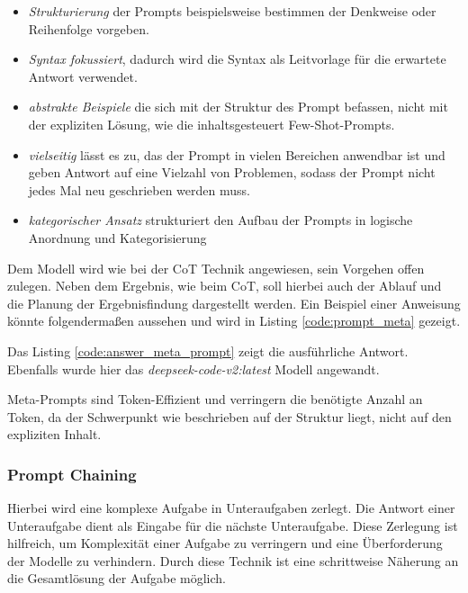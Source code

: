 \begin{itemize}
	\item \textit{Strukturierung} der Prompts beispielsweise bestimmen der Denkweise oder Reihenfolge vorgeben.
	\item \textit{Syntax fokussiert}, dadurch wird die Syntax als Leitvorlage für die erwartete Antwort verwendet.
	\item \textit{abstrakte Beispiele} die sich mit der Struktur des Prompt befassen, nicht mit der expliziten Lösung, wie die inhaltsgesteuert Few-Shot-Prompts.
	\item \textit{vielseitig} lässt es zu, das der Prompt in vielen Bereichen anwendbar ist und geben Antwort auf eine Vielzahl von Problemen, sodass der Prompt nicht jedes Mal neu geschrieben werden muss.
	\item \textit{kategorischer Ansatz} strukturiert den Aufbau der Prompts in logische Anordnung und Kategorisierung 
\end{itemize}

Dem Modell wird wie bei der CoT Technik angewiesen, sein Vorgehen offen zulegen. Neben dem Ergebnis, wie beim CoT, soll hierbei auch der Ablauf und die Planung der Ergebnisfindung dargestellt werden. Ein Beispiel einer Anweisung könnte folgendermaßen aussehen und wird in Listing \ref{code:prompt_meta} gezeigt.



Das Listing \ref{code:answer_meta_prompt} zeigt die ausführliche Antwort. Ebenfalls wurde hier das \textit{deepseek-code-v2:latest} Modell angewandt.



Meta-Prompts sind Token-Effizient und verringern die benötigte Anzahl an Token, da der Schwerpunkt wie beschrieben auf der Struktur liegt, nicht auf den expliziten Inhalt.


\subsubsection{Prompt Chaining}
Hierbei wird eine komplexe Aufgabe in Unteraufgaben zerlegt. Die Antwort einer Unteraufgabe dient als Eingabe für die nächste Unteraufgabe. Diese Zerlegung ist hilfreich, um Komplexität einer Aufgabe zu verringern und eine Überforderung der Modelle zu verhindern. Durch diese Technik ist eine schrittweise Näherung an die Gesamtlösung der Aufgabe möglich.\vspace{0.2cm}

